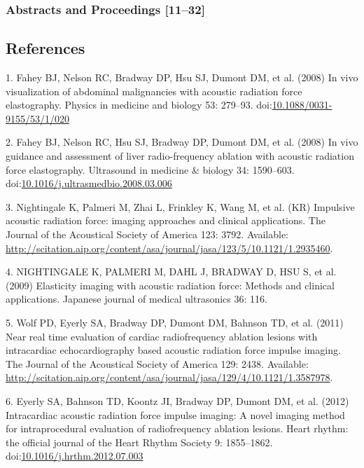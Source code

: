 \documentclass[]{article}
\begin{document}
\subsubsection{Abstracts and Proceedings
{[}11--32{]}}\label{abstracts-and-proceedings-hsu2007cbradway2007fahey2007bbradway2009husarik2009nelson2009bradway2009bhsu2010hollender2010bradway2010bradway2010bbradway2011byram2011byram2011bbradway2012bradway2012bhollender2012eyerly2012bhollender2012bgoswami2013patel2013bradway2014}

\subsection*{References}\label{references}

1. Fahey BJ, Nelson RC, Bradway DP, Hsu SJ, Dumont DM, et al. (2008) In
vivo visualization of abdominal malignancies with acoustic radiation
force elastography. Physics in medicine and biology 53: 279--93.
doi:\href{http://dx.doi.org/10.1088/0031-9155/53/1/020}{10.1088/0031-9155/53/1/020}

2. Fahey BJ, Nelson RC, Hsu SJ, Bradway DP, Dumont DM, et al. (2008) In
vivo guidance and assessment of liver radio-frequency ablation with
acoustic radiation force elastography. Ultrasound in medicine \& biology
34: 1590--603.
doi:\href{http://dx.doi.org/10.1016/j.ultrasmedbio.2008.03.006}{10.1016/j.ultrasmedbio.2008.03.006}

3. Nightingale K, Palmeri M, Zhai L, Frinkley K, Wang M, et al. (KR)
Impulsive acoustic radiation force: imaging approaches and clinical
applications. The Journal of the Acoustical Society of America 123:
3792. Available:
\url{http://scitation.aip.org/content/asa/journal/jasa/123/5/10.1121/1.2935460}.

4. NIGHTINGALE K, PALMERI M, DAHL J, BRADWAY D, HSU S, et al. (2009)
Elasticity imaging with acoustic radiation force: Methods and clinical
applications. Japanese journal of medical ultrasonics 36: 116.

5. Wolf PD, Eyerly SA, Bradway DP, Dumont DM, Bahnson TD, et al. (2011)
Near real time evaluation of cardiac radiofrequency ablation lesions
with intracardiac echocardiography based acoustic radiation force
impulse imaging. The Journal of the Acoustical Society of America 129:
2438. Available:
\url{http://scitation.aip.org/content/asa/journal/jasa/129/4/10.1121/1.3587978}.

6. Eyerly SA, Bahnson TD, Koontz JI, Bradway DP, Dumont DM, et al.
(2012) Intracardiac acoustic radiation force impulse imaging: A novel
imaging method for intraprocedural evaluation of radiofrequency ablation
lesions. Heart rhythm: the official journal of the Heart Rhythm Society
9: 1855--1862.
doi:\href{http://dx.doi.org/10.1016/j.hrthm.2012.07.003}{10.1016/j.hrthm.2012.07.003}
\end{document}
